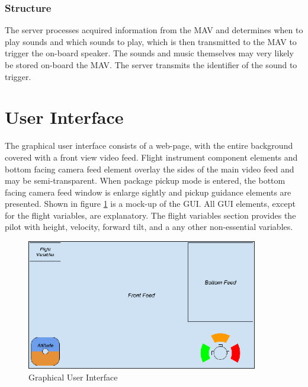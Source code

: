 \documentclass[onecolumn, oneside, letterpaper, draftclsnofoot, 10pt, compsoc]{IEEEtran}
\begin{document}
\subsubsection{Structure}
The server processes acquired information from the MAV and determines when to play sounds and which sounds to play, which is then transmitted to the MAV to trigger the on-board speaker. The sounds and music themselves may very likely be stored on-board the MAV. The server transmits the identifier of the sound to trigger.

\section{User Interface}
The graphical user interface consists of a web-page, with the entire background covered with a front view video feed. Flight instrument component elements and bottom facing camera feed element overlay the sides of the main video feed and may be semi-transparent. When package pickup mode is entered, the bottom facing camera feed window is enlarge sightly and pickup guidance elements are presented. Shown in figure \ref{fig:UI} is a mock-up of the GUI. All GUI elements, except for the flight variables, are explanatory. The flight variables section provides the pilot with height, velocity, forward tilt, and a any other non-essential variables.

\begin{figure}[h]
    \centering
    \includegraphics[width=0.9\textwidth]{graphics/ui.eps}
    \caption{Graphical User Interface}
    \label{fig:UI}
\end{figure}

\clearpage
\medskip


\end{document}
